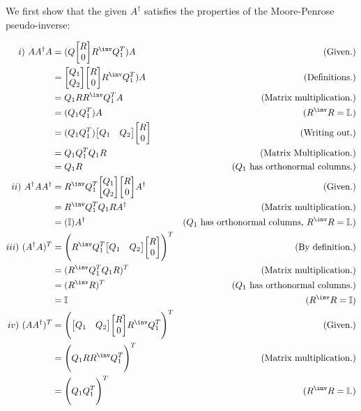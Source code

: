 \partbreak
\begin{solution}

    We first show that the given $A^\dag$ satisfies the properties of the Moore-Penrose pseudo-inverse:

    \alignbreak
    \begin{align*}
        i) \ AA^\dag A &= (Q\mqty[R\\0]R^\inv Q_1^T)A &\text{(Given.)}\\
        &= \mqty[Q_1\\Q_2] \mqty[R\\0]R^\inv Q_1^T)A &\text{(Definitions.)}\\
        &=  Q_1RR^\inv Q_1^T A &\text{(Matrix multiplication.)}\\
        &= (Q_1Q_1^T)A &\text{($R^\inv R = \id$.)}\\
        &= (Q_1Q_1^T)\mqty[Q_1&Q_2]\mqty[R\\0] &\text{(Writing out.)}\\
        &= Q_1Q_1^TQ_1R &\text{(Matrix Multiplication.)}\\
        &= Q_1R &\text{($Q_1$ has orthonormal columns.)}\\
        ii) \ A^\dag A A^\dag &= R^\inv Q_1^T\mqty[Q_1\\Q_2]\mqty[R\\0]A^\dag &\text{(Given.)}\\
        &= R^\inv Q_1^TQ_1R A^\dag &\text{(Matrix multiplication.)}\\
        &= (\id)A^\dag &\text{($Q_1$ has orthonormal columns, $R^\inv R = \id$.)}\\
        iii) \ (A^\dag A)^T &= \Bigg( R^\inv Q_1^T \mqty[Q_1 &Q_2]\mqty[R\\0]\Bigg)^T &\text{(By definition.)}\\
        &= (R^\inv Q_1^TQ_1R)^T &\text{(Matrix multiplication.)}\\
        &= (R^\inv R)^T &\text{($Q_1$ has orthonormal columns.)}\\
        &= \id &\text{($R^\inv R = \id$)}\\
        iv) \ (AA^\dag)^T &=\Bigg(\mqty[Q_1 &Q_2]\mqty[R\\0]R^\inv Q_1^T\Bigg)^T &\text{(Given.)}\\
        &= \Bigg(Q_1RR^\inv Q_1^T\Bigg)^T &\text{(Matrix multiplication.)}\\
        &= \Bigg(Q_1 Q_1^T\Bigg)^T  &(R^\inv R = \id.)\\
    \end{align*}
    \alignbreak


\end{solution}

